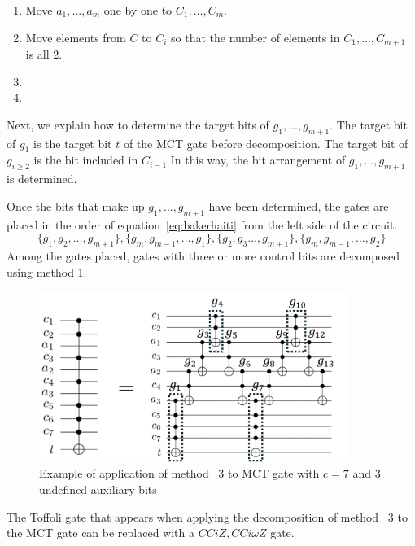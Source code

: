 \begin{enumerate}[Step 1]

\item Move $a_{1},\dots,a_{m}$ one by one to $C_{1},\dots ,C_{m}$.

\item Move elements from $C$ to $C_{i}$ so that the number of elements in $C_{1},\dots,C_{m+1}$ is all 2. 
\item {}
\item {}
\end{enumerate}
\par
Next, we explain how to determine the target bits of $g_{1},\dots ,g_{m+1}$.
The target bit of $g_{1}$ is the target bit $t$ of the MCT gate before decomposition.
The target bit of $g_{i\geq 2}$ is the bit included in $C_{i-1}$
In this way, the bit arrangement of $g_{1},\dots, g_{m+1}$ is determined.
\par
Once the bits that make up $g_{1},\dots,g_{m+1}$ have been determined,
the gates are placed in the order of equation~\ref{eq:bakerhaiti} from the left side of the circuit.
\begin{equation}\label{eq:bakerhaiti}
\{g_{1}, g_{2}, \dots, g_{m+1}\},\{g_{m},g_{m-1}, \dots, g_{1}\}, \{g_{2}, g_{3} \dots, g_{m+1}\}, \{g_{m}, g_{m-1}, \dots, g_{2}\}
\end{equation}
Among the gates placed, gates with three or more control bits are decomposed using method 1.
\begin{figure}[tbp]
\centering
\includegraphics[width=10cm]{img/baker.pdf}
\caption{Example of application of method ~3 to MCT gate with $c=7$ and 3 undefined auxiliary bits}
\label{baker}
\end{figure}
\par
The Toffoli gate that appears when applying the decomposition of method ~3 to the MCT gate can be replaced with a $CCiZ, CCi\omega Z$ gate.

